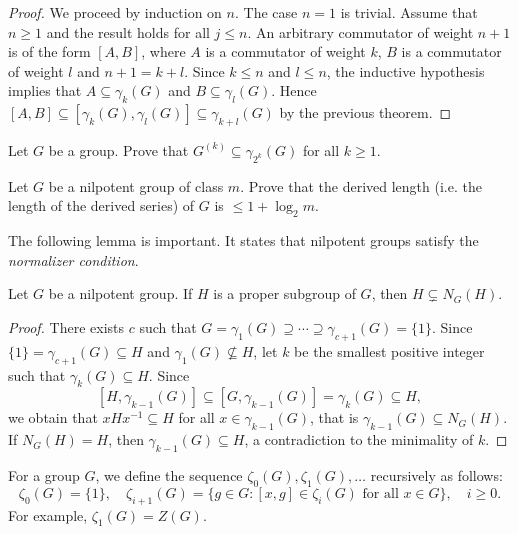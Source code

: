 \begin{proof}
We proceed by induction on $n$. The case $n=1$ is trivial. Assume that $n\geq1$ and 
the result holds for all $j\leq n$. An arbitrary commutator of weight $n+1$ 
is of the form $[A,B]$, where $A$ is a commutator of weight $k$,
$B$ is a commutator of weight $l$ and $n+1=k+l$. Since $k\leq n$ and $l\leq n$, 
the inductive hypothesis implies that  $A\subseteq \gamma_k(G)$ and $B\subseteq
\gamma_l(G)$. Hence $[A,B]\subseteq [\gamma_k(G),\gamma_l(G)]\subseteq
\gamma_{k+l}(G)$ by the previous theorem.
\end{proof}

\begin{exercise}
\label{xca:inclusion}
    Let $G$ be a group. Prove that $G^{(k)}\subseteq \gamma_{2^k}(G)$ for all $k\geq1$. 
\end{exercise}

\begin{exercise}
\label{xca:derived_length}
    Let $G$ be a nilpotent group of class $m$. Prove that
    the derived length (i.e. 
    the length of the derived series) of $G$ is $\leq 1+\log_2m$.
\end{exercise}


The following lemma is important. It states that nilpotent groups satisfy 
the \emph{normalizer condition}. 

\begin{lemma}
\label{lem:normalizadora}
Let $G$ be a nilpotent group. If $H$ is a proper subgroup of $G$, then 
$H\subsetneq N_G(H)$.
\end{lemma}

\begin{proof}
There exists $c$ such that $G=\gamma_1(G)\supseteq\cdots\supseteq\gamma_{c+1}(G)=\{1\}$. Since 
$\{1\}=\gamma_{c+1}(G)\subseteq H$ and $\gamma_1(G)\not\subseteq H$, 
let $k$ be the smallest positive integer such that  $\gamma_k(G)\subseteq H$. 
Since
\[
[H,\gamma_{k-1}(G)]\subseteq [G,\gamma_{k-1}(G)]=\gamma_k(G)\subseteq H,
\]
we obtain that  
$xHx^{-1}\subseteq H$ for all $x\in\gamma_{k-1}(G)$,
that is $\gamma_{k-1}(G)\subseteq N_G(H)$. If $N_G(H)=H$, then
$\gamma_{k-1}(G)\subseteq H$, a contradiction to the minimality of $k$. 
\end{proof}

For a group $G$, we define the sequence  $\zeta_0(G),\zeta_1(G),\dots$
recursively as follows: 
\[
	\zeta_0(G)=\{1\},\quad
	\zeta_{i+1}(G)=\{g\in G:[x,g]\in\zeta_{i}(G)\text{ for all $x\in G$}\},\quad i\geq 0.
\]
For example, $\zeta_1(G)=Z(G)$.

